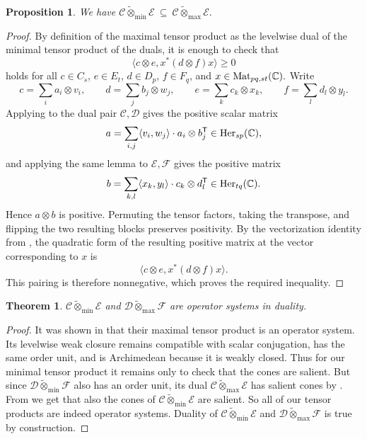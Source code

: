 \documentclass[11pt,onecolumn]{article}
\theoremstyle{plain}
\newtheorem{theorem}{Theorem}[section]
\newtheorem{proposition}[proposition]{Proposition}
\theoremstyle{definition}
\begin{document}
\begin{proposition}
\label{lem:minmax}
We have $\mathcal C\tilde\otimes_{\min}\mathcal E\ \subseteq\ \mathcal C\tilde\otimes_{\max}\mathcal E.$
\end{proposition}
\begin{proof}
    By definition of the maximal tensor product as the levelwise dual of the
    minimal tensor product of the duals, it is enough to check that
    \[
        \langle c\otimes e, x^*(d\otimes f)x\rangle\geqslant 0
    \]
    holds for all $c\in C_s$, $e\in E_t$, $d\in D_p$, $f\in F_q$, and
    $x\in {\rm Mat}_{pq,st}(\mathbb C).$
    Write
    \[
        c=\sum_i a_i\otimes v_i,
        \qquad d=\sum_j b_j\otimes w_j,
        \qquad
        e=\sum_k c_k\otimes x_k,
        \qquad f=\sum_l d_l\otimes y_l .
    \]
    Applying  to the dual pair $\mathcal C,\mathcal D$ gives
    the positive scalar matrix
    \[
        a=\sum_{i,j}\langle v_i,w_j\rangle\cdot
        a_i\otimes b_j^{\mathsf T}
        \in {\rm Her}_{sp}(\mathbb C),
    \]
    and applying the same lemma to $\mathcal E,\mathcal F$ gives the positive matrix
    \[
        b=\sum_{k,l}\langle x_k,y_l\rangle\cdot
        c_k\otimes d_l^{\mathsf T}
        \in {\rm Her}_{tq}(\mathbb C).
    \]
    Hence $a\otimes b$ is positive. Permuting the tensor factors, taking the
    transpose, and flipping the two resulting blocks preserves positivity.
    By the vectorization identity from , the quadratic form of
    the resulting positive matrix at the vector corresponding to $x$ is
    \[
        \langle c\otimes e, x^*(d\otimes f)x\rangle.
    \]
    This pairing is therefore nonnegative, which proves the required
    inequality.
\end{proof}

\begin{theorem}
    $\mathcal C\tilde\otimes_{\min}\mathcal E$ and $\mathcal D\tilde\otimes_{\max}\mathcal F$ are operator systems in duality.
\end{theorem}
\begin{proof}
    It was shown in \cite{KavrukPaulsenTodorovTomforde2011} that their maximal tensor product is an operator system. Its levelwise weak closure remains compatible with scalar conjugation, has the same order unit, and is Archimedean because it is weakly closed. Thus for our minimal tensor product it remains only to check that the cones are salient. But since $\mathcal D\tilde\otimes_{\min}\mathcal F$ also has an order unit, its dual $\mathcal C\tilde\otimes_{\max}\mathcal E$ has salient cones by .
    From  we get that also the cones of $\mathcal C\tilde\otimes_{\min}\mathcal E$ are salient. So all of our tensor products are indeed operator systems. Duality of  $\mathcal C\tilde\otimes_{\min}\mathcal E$ and $\mathcal D\tilde\otimes_{\max}\mathcal F$ is true by construction.
\end{proof}
\end{document}
